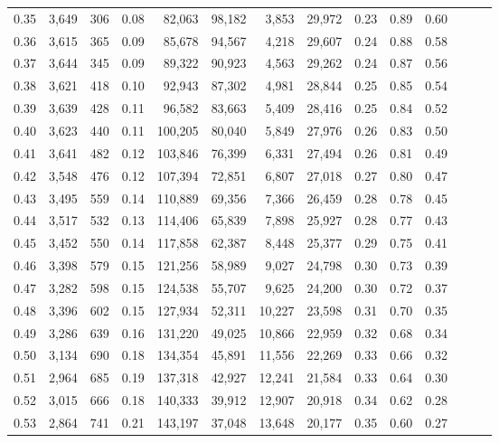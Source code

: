 \begin{tabular}{rrrrrrrrrrrrrr}
0.35 &  3,649 &  306 &  0.08 &   82,063 &   98,182 &   3,853 &  29,972 &  0.23 &  0.89 &      0.60 \\
0.36 &  3,615 &  365 &  0.09 &   85,678 &   94,567 &   4,218 &  29,607 &  0.24 &  0.88 &      0.58 \\
0.37 &  3,644 &  345 &  0.09 &   89,322 &   90,923 &   4,563 &  29,262 &  0.24 &  0.87 &      0.56 \\
0.38 &  3,621 &  418 &  0.10 &   92,943 &   87,302 &   4,981 &  28,844 &  0.25 &  0.85 &      0.54 \\
0.39 &  3,639 &  428 &  0.11 &   96,582 &   83,663 &   5,409 &  28,416 &  0.25 &  0.84 &      0.52 \\
0.40 &  3,623 &  440 &  0.11 &  100,205 &   80,040 &   5,849 &  27,976 &  0.26 &  0.83 &      0.50 \\
0.41 &  3,641 &  482 &  0.12 &  103,846 &   76,399 &   6,331 &  27,494 &  0.26 &  0.81 &      0.49 \\
0.42 &  3,548 &  476 &  0.12 &  107,394 &   72,851 &   6,807 &  27,018 &  0.27 &  0.80 &      0.47 \\
0.43 &  3,495 &  559 &  0.14 &  110,889 &   69,356 &   7,366 &  26,459 &  0.28 &  0.78 &      0.45 \\
0.44 &  3,517 &  532 &  0.13 &  114,406 &   65,839 &   7,898 &  25,927 &  0.28 &  0.77 &      0.43 \\
0.45 &  3,452 &  550 &  0.14 &  117,858 &   62,387 &   8,448 &  25,377 &  0.29 &  0.75 &      0.41 \\
0.46 &  3,398 &  579 &  0.15 &  121,256 &   58,989 &   9,027 &  24,798 &  0.30 &  0.73 &      0.39 \\
0.47 &  3,282 &  598 &  0.15 &  124,538 &   55,707 &   9,625 &  24,200 &  0.30 &  0.72 &      0.37 \\
0.48 &  3,396 &  602 &  0.15 &  127,934 &   52,311 &  10,227 &  23,598 &  0.31 &  0.70 &      0.35 \\
0.49 &  3,286 &  639 &  0.16 &  131,220 &   49,025 &  10,866 &  22,959 &  0.32 &  0.68 &      0.34 \\
0.50 &  3,134 &  690 &  0.18 &  134,354 &   45,891 &  11,556 &  22,269 &  0.33 &  0.66 &      0.32 \\
0.51 &  2,964 &  685 &  0.19 &  137,318 &   42,927 &  12,241 &  21,584 &  0.33 &  0.64 &      0.30 \\
0.52 &  3,015 &  666 &  0.18 &  140,333 &   39,912 &  12,907 &  20,918 &  0.34 &  0.62 &      0.28 \\
0.53 &  2,864 &  741 &  0.21 &  143,197 &   37,048 &  13,648 &  20,177 &  0.35 &  0.60 &      0.27 \\

\end{tabular}
